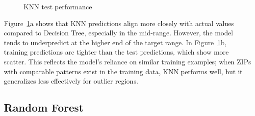 \begin{figure}[!ht]
    \centering
    \hfill
    \caption{KNN test performance}
    \caption*{\hspace{1em}}
    \label{fig:knn_results}
\end{figure}
\FloatBarrier

Figure~\ref{fig:knn_results}a shows that KNN predictions align more closely with actual values compared to Decision Tree, especially in the mid-range. However, the model tends to underpredict at the higher end of the target range. In Figure~\ref{fig:knn_results}b, training predictions are tighter than the test predictions, which show more scatter. This reflects the model’s reliance on similar training examples; when ZIPs with comparable patterns exist in the training data, KNN performs well, but it generalizes less effectively for outlier regions.

\subsection{Random Forest}

